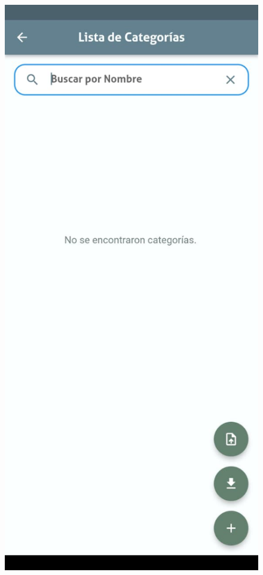 \documentclass[12pt, a4paper]{book}
\begin{document}
\begin{figure}[H]
  \centering
  \begin{minipage}[b]{0.3\textwidth}
    \centering
    \includegraphics[width=\textwidth]{images/functionality_test/load_categories_1.jpg}

\end{minipage}
\end{figure}
\end{document}
